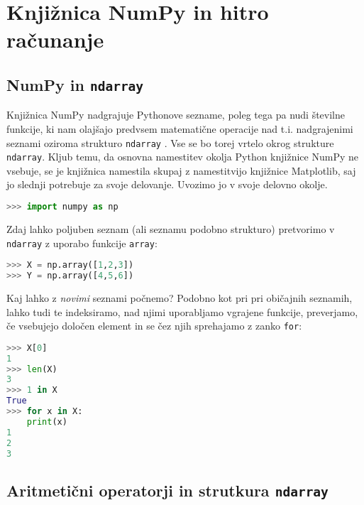 \chapter{Knjižnica NumPy in hitro računanje}

\section{NumPy in \texttt{ndarray}}

Knjižnica NumPy nadgrajuje Pythonove sezname, poleg tega pa nudi številne funkcije, ki nam olajšajo predvsem matematične operacije nad t.i. nadgrajenimi seznami oziroma strukturo \texttt{ndarray} . Vse se bo torej vrtelo okrog strukture \texttt{ndarray}. Kljub temu, da osnovna namestitev okolja Python knjižnice NumPy ne vsebuje, se je knjižnica namestila skupaj z namestitvijo knjižnice Matplotlib, saj jo slednji potrebuje za svoje delovanje. Uvozimo jo v svoje delovno okolje.
\begin{lstlisting}[language=Python]
>>> import numpy as np
\end{lstlisting}
Zdaj lahko poljuben seznam (ali seznamu podobno strukturo) pretvorimo v \texttt{ndarray} z uporabo funkcije \texttt{array}:
\begin{lstlisting}[language=Python]
>>> X = np.array([1,2,3])
>>> Y = np.array([4,5,6])
\end{lstlisting}
Kaj lahko z \emph{novimi} seznami počnemo? Podobno kot pri pri običajnih seznamih, lahko tudi te indeksiramo, nad njimi uporabljamo vgrajene funkcije, preverjamo, če vsebujejo določen element in se čez njih sprehajamo z zanko \texttt{for}:
\begin{lstlisting}[language=Python]
>>> X[0]
1
>>> len(X)
3
>>> 1 in X
True
>>> for x in X:
	print(x)
1
2
3
\end{lstlisting}

\section{Aritmetični operatorji in strutkura \texttt{ndarray}}

